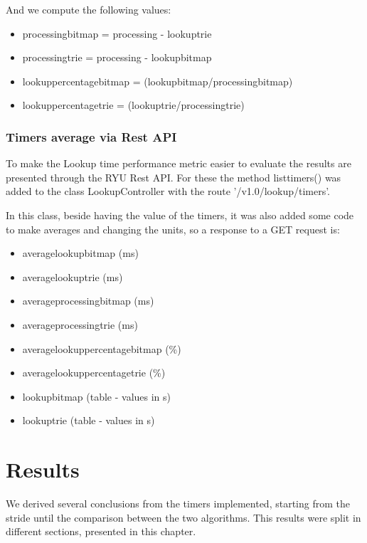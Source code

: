 \documentclass[]{report}
\begin{document}
And we compute the following values:
\begin{itemize}
\item processing\textunderscore bitmap = processing - lookup\textunderscore trie
\item processing\textunderscore trie = processing  - lookup\textunderscore bitmap
\item lookup\textunderscore percentage\textunderscore bitmap = (lookup\textunderscore bitmap/processing\textunderscore bitmap)
\item lookup\textunderscore percentage\textunderscore trie = (lookup\textunderscore trie/processing\textunderscore trie)
\end{itemize} 



\subsection{Timers average via Rest API}
To make the Lookup time performance metric easier to evaluate the results are presented through the RYU Rest API. For these the method list\textunderscore timers() was added to the class LookupController with the route '/v1.0/lookup/timers'.

In this class, beside having the value of the timers, it was also added some code to make averages and changing the units, so a response to a GET request is:

\begin{itemize}
\item average\textunderscore lookup\textunderscore bitmap (ms)
\item average\textunderscore lookup\textunderscore trie (ms)
\item average\textunderscore processing\textunderscore bitmap (ms)
\item average\textunderscore processing\textunderscore trie (ms)
\item average\textunderscore lookup\textunderscore percentage\textunderscore bitmap (\%)
\item average\textunderscore lookup\textunderscore percentage\textunderscore trie (\%)
\item lookup\textunderscore bitmap (table - values in s)
\item lookup\textunderscore trie (table - values in s)
\end{itemize}




\chapter{Results}
We derived several conclusions from the timers implemented, starting from the stride until the comparison between the two algorithms. This results were split in different sections, presented in this chapter.
\end{document}
